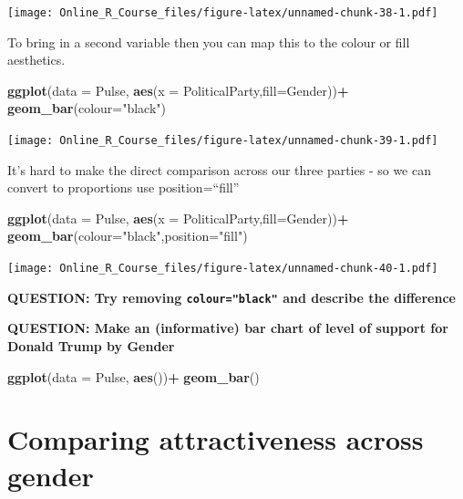 \documentclass[]{book}
\newenvironment{Shaded}{\begin{snugshade}}{\end{snugshade}}
\newcommand{\DataTypeTok}[1]{\textcolor[rgb]{0.13,0.29,0.53}{#1}}
\newcommand{\KeywordTok}[1]{\textcolor[rgb]{0.13,0.29,0.53}{\textbf{#1}}}
\newcommand{\NormalTok}[1]{#1}
\newcommand{\OperatorTok}[1]{\textcolor[rgb]{0.81,0.36,0.00}{\textbf{#1}}}
\newcommand{\StringTok}[1]{\textcolor[rgb]{0.31,0.60,0.02}{#1}}
\begin{document}
\texttt{[image: Online\_R\_Course\_files/figure-latex/unnamed-chunk-38-1.pdf]}

To bring in a second variable then you can map this to the colour or fill aesthetics.

\begin{Shaded}
\begin{Highlighting}[]
\KeywordTok{ggplot}\NormalTok{(}\DataTypeTok{data =}\NormalTok{ Pulse,  }\KeywordTok{aes}\NormalTok{(}\DataTypeTok{x =}\NormalTok{ PoliticalParty,}\DataTypeTok{fill=}\NormalTok{Gender))}\OperatorTok{+}
\StringTok{  }\KeywordTok{geom_bar}\NormalTok{(}\DataTypeTok{colour=}\StringTok{"black"}\NormalTok{)}
\end{Highlighting}
\end{Shaded}

\texttt{[image: Online\_R\_Course\_files/figure-latex/unnamed-chunk-39-1.pdf]}

It's hard to make the direct comparison across our three parties - so we can convert to proportions use position=``fill''

\begin{Shaded}
\begin{Highlighting}[]
\KeywordTok{ggplot}\NormalTok{(}\DataTypeTok{data =}\NormalTok{ Pulse,  }\KeywordTok{aes}\NormalTok{(}\DataTypeTok{x =}\NormalTok{ PoliticalParty,}\DataTypeTok{fill=}\NormalTok{Gender))}\OperatorTok{+}
\StringTok{  }\KeywordTok{geom_bar}\NormalTok{(}\DataTypeTok{colour=}\StringTok{"black"}\NormalTok{,}\DataTypeTok{position=}\StringTok{"fill"}\NormalTok{)}
\end{Highlighting}
\end{Shaded}

\texttt{[image: Online\_R\_Course\_files/figure-latex/unnamed-chunk-40-1.pdf]}

\textbf{QUESTION: Try removing \texttt{colour="black"} and describe the difference}

\textbf{QUESTION: Make an (informative) bar chart of level of support for Donald Trump by Gender}

\begin{Shaded}
\begin{Highlighting}[]
\KeywordTok{ggplot}\NormalTok{(}\DataTypeTok{data =}\NormalTok{ Pulse,  }\KeywordTok{aes}\NormalTok{())}\OperatorTok{+}
\StringTok{  }\KeywordTok{geom_bar}\NormalTok{()}
\end{Highlighting}
\end{Shaded}

\hypertarget{comparing-attractiveness-across-gender}{%
\section{Comparing attractiveness across gender}\label{comparing-attractiveness-across-gender}}
\end{document}

